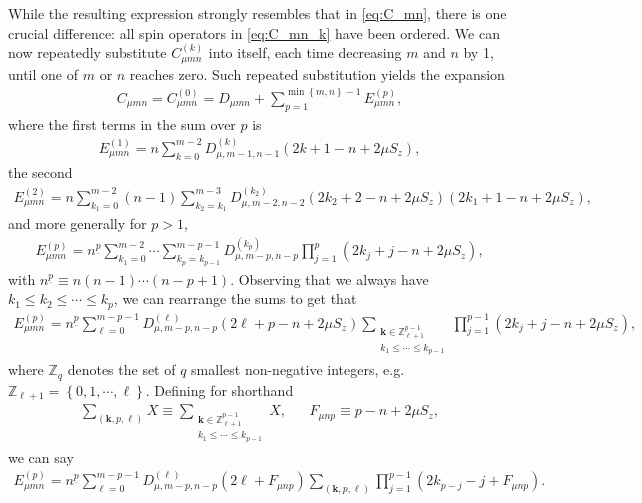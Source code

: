 \documentclass[aps,notitlepage,nofootinbib,11pt]{revtex4-1}
\newcommand{\p}[1]{\left(#1\right)} %
\renewcommand{\set}[1]{\left\{#1\right\}} %
\renewcommand{\v}{\bm} %
\newcommand{\Z}{\mathbb{Z}}
\newcommand{\1}{\mathds{1}}
\begin{document}
While the resulting expression strongly resembles that in
\eqref{eq:C_mn}, there is one crucial difference: all spin operators
in \eqref{eq:C_mn_k} have been ordered.  We can now repeatedly
substitute $C_{\mu mn}^{(k)}$ into itself, each time decreasing $m$
and $n$ by 1, until one of $m$ or $n$ reaches zero.  Such repeated
substitution yields the expansion
\begin{align}
  C_{\mu mn}
  = C_{\mu mn}^{(0)}
  = D_{\mu mn}
  + \sum_{p=1}^{\min\set{m,n}-1} E_{\mu mn}^{(p)},
\end{align}
where the first terms in the sum over $p$ is
\begin{align}
  E_{\mu mn}^{(1)}
  = n \sum_{k=0}^{m-2} D_{\mu,m-1,n-1}^{(k)}
  \p{2k+1-n+2\mu S_z},
  \label{eq:E_mn_1_first}
\end{align}
the second
\begin{align}
  E_{\mu mn}^{(2)}
  = n \sum_{k_1=0}^{m-2} \p{n-1} \sum_{k_2=k_1}^{m-3}
  D_{\mu,m-2,n-2}^{(k_2)}
  \p{2k_2+2-n+2\mu S_z} \p{2k_1+1-n+2\mu S_z},
\end{align}
and more generally for $p>1$,
\begin{align}
  E_{\mu mn}^{(p)}
  = n^{\underline{p}}
  \sum_{k_1=0}^{m-2}\cdots\sum_{k_p=k_{p-1}}^{m-p-1}
  D_{\mu,m-p,n-p}^{(k_p)} \prod_{j=1}^p \p{2k_j+j-n+2\mu S_z},
\end{align}
with $n^{\underline{p}}\equiv n\p{n-1}\cdots\p{n-p+1}$.  Observing
that we always have $k_1\le k_2\le\cdots\le k_p$, we can rearrange the
sums to get that
\begin{align}
  E_{\mu mn}^{(p)}
  = n^{\underline{p}}
  \sum_{\ell=0}^{m-p-1} D_{\mu,m-p,n-p}^{(\ell)} \p{2\ell+p-n+2\mu S_z}
  \sum_{\substack{\v k\in\Z_{\ell+1}^{p-1}\\k_1\le\cdots\le k_{p-1}}}
  \prod_{j=1}^{p-1} \p{2k_j+j-n+2\mu S_z},
\end{align}
where $\Z_q$ denotes the set of $q$ smallest non-negative integers,
e.g.~$\Z_{\ell+1}=\set{0,1,\cdots,\ell}$.  Defining for shorthand
\begin{align}
  \sum_{\p{\v k,p,\ell}} X \equiv
  \sum_{\substack{\v k\in\Z_{\ell+1}^{p-1}\\k_1\le\cdots\le k_{p-1}}} X,
  &&
  F_{\mu np} \equiv p - n + 2\mu S_z,
\end{align}
we can say
\begin{align}
  E_{\mu mn}^{(p)}
  = n^{\underline{p}}
  \sum_{\ell=0}^{m-p-1} D_{\mu,m-p,n-p}^{(\ell)} \p{2\ell+F_{\mu np}}
  \sum_{\p{\v k,p,\ell}} \prod_{j=1}^{p-1} \p{2k_{p-j}-j+F_{\mu np}}.
  \label{eq:E_mn_p_k_sum}
\end{align}
\end{document}
